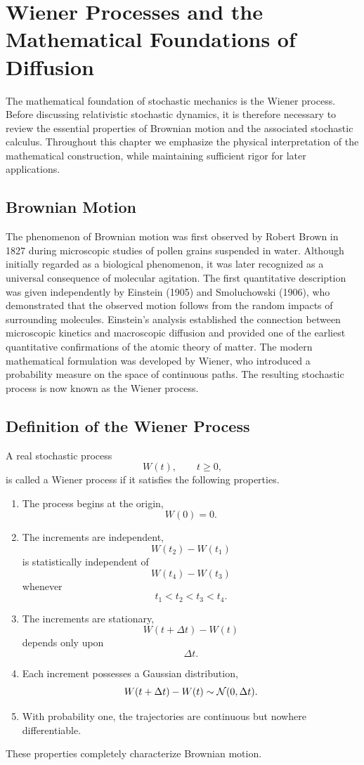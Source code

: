 \section{Wiener Processes and the Mathematical Foundations of Diffusion}
The mathematical foundation of stochastic mechanics is the Wiener
process. Before discussing relativistic stochastic dynamics, it is
therefore necessary to review the essential properties of Brownian
motion and the associated stochastic calculus. Throughout this chapter
we emphasize the physical interpretation of the mathematical
construction, while maintaining sufficient rigor for later applications.
\subsection{Brownian Motion}
The phenomenon of Brownian motion was first observed by Robert Brown in
1827 during microscopic studies of pollen grains suspended in water.
Although initially regarded as a biological phenomenon, it was later
recognized as a universal consequence of molecular agitation.
The first quantitative description was given independently by Einstein
(1905) and Smoluchowski (1906), who demonstrated that the observed
motion follows from the random impacts of surrounding molecules.
Einstein's analysis established the connection between microscopic
kinetics and macroscopic diffusion and provided one of the earliest
quantitative confirmations of the atomic theory of matter.
The modern mathematical formulation was developed by Wiener, who
introduced a probability measure on the space of continuous paths. The
resulting stochastic process is now known as the Wiener process.
\subsection{Definition of the Wiener Process}
A real stochastic process
\[W(t),\qquad t\ge0,\]
is called a Wiener process if it satisfies the following properties.
\begin{enumerate}
\item
The process begins at the origin,
\[W(0)=0.\]
\item
The increments are independent,
\[W(t_2)-W(t_1)\]
is statistically independent of
\[W(t_4)-W(t_3)\]
whenever
\[t_1<t_2<t_3<t_4.\]
\item
The increments are stationary,
\[W(t+\Delta t)-W(t)\]
depends only upon
\[\Delta t.\]
\item
Each increment possesses a Gaussian distribution,
\[W(t+\Delta t)-W(t)\sim{\cal N}(0,\Delta t).\]
\item
With probability one, the trajectories are continuous but nowhere
differentiable.
\end{enumerate}
These properties completely characterize Brownian motion.

